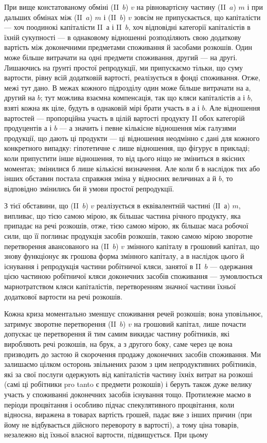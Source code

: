 При вище констатованому обміні (II~$b$) $v$ на рівновартісну частину
(II~$a$) $m$ і при дальших обмінах між (II~$a$) $m$ і (II~$b$) $v$ зовсім не припускається,
що капіталісти — хоч поодинокі капіталісти II~$а$ і II~$b$, хоч відповідні
категорії капіталістів в їхній сукупності — в однаковому відношенні
розподіляють свою додаткову вартість між доконечними предметами споживання
й засобами розкошів. Один може більше витрачати на одні
предмети споживання, другий — на другі. Лишаючись на ґрунті простої
репродукції, ми припускаємо тільки, що суму вартости, рівну всій додатковій
вартості, реалізується в фонді споживання. Отже, межі тут
дано. В межах кожного підрозділу один може більше витрачати на $а$,
другий на $b$; тут можлива взаємна компенсація, так що кляси капіталістів
$а$ і $b$, взяті кожна як ціле, будуть в однаковій мірі брати участь
в $а$ і $b$. Але відношення вартостей — пропорційна участь в цілій вартості
продукту II обох категорій продуцентів $а$ і $b$ — а значить і певне кількісне
відношення між галузями продукції, що дають ці продукти — ці
відношення неодмінно є дані для кожного конкретного випадку: гіпотетичне
є лише відношення, що фігурує в прикладі; коли припустити
інше відношення, то від цього ніщо не зміниться в якісних моментах;
змінилися б лише кількісні визначення. Але коли б в наслідок тих або
інших обставин постала справжня зміна у відносних величинах $а$ й $b$, то
відповідно змінились би й умови простої репродукції.

З тієї обставини, що (II~$b$) $v$ реалізується в еквівалентній частині
(ІІ~$а$) $m$, випливає, що тією самою мірою, як більшає частина річного
продукту, яка припадає на речі розкошів, отже, тією самою мірою, як
більшає маса робочої сили, що її поглинає продукція засобів розкошів,
такою самою мірою зворотне перетворення авансованого на (II~$b$) $v$
змінного капіталу в грошовий капітал, що знову функціонує як грошова
форма змінного капіталу, а в наслідок цього й існування і репродукція
частини робітничої кляси, занятої в II~$b$ — одержання цією частиною робітничої
кляси доконечних засобів споживання — зумовлюється марнотратством
кляси капіталістів, перетворенням значної частини їхньої додаткової
вартости на речі розкошів.

Кожна криза моментально зменшує споживання речей розкошів; вона
уповільнює, затримує зворотне перетворення (II~$b$) $v$ на грошовий капітал,
лише почасти допускає це перетворення й тим самим викидає частину робітників,
які виробляють речі розкошів, на брук, а з другого боку, саме через
це вона призводить до застою й скорочення продажу доконечних засобів
споживання. Ми залишаємо цілком осторонь звільнених разом з цим
непродуктивних робітників, які за свої послуги одержують від капіталістів
частину їхніх витрат на розкоші (самі ці робітники pro tanto є
предмети розкошів) і беруть також дуже велику участь у споживанні
доконечних засобів існування тощо. Протилежне маємо в періоди процвітання
і особливо підчас спекулятивного процвітання, коли відносна,
виражена в товарах вартість грошей, падає вже з інших причин (при
йому не відбувається дійсного перевороту в вартості), а тому ціна товарів,
незалежно від їхньої власної вартости, підвищується. При цьому
\parbreak{}  %
